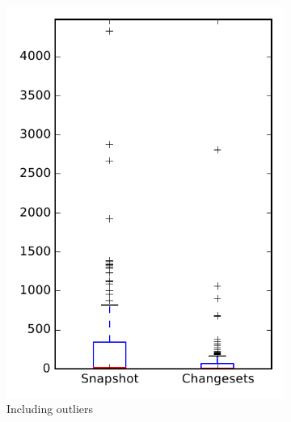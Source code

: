 
\begin{figure}
    \centering
    \begin{subfigure}{.4\textwidth}
        \centering
        \includegraphics[height=0.4\textheight]{figures/flt/rq1_openjpa}
        \caption{Including outliers}\label{fig:flt:rq1:openjpa_outlier}
    \end{subfigure}%
    \begin{subfigure}{.4\textwidth}
        \centering

\end{subfigure}
\end{figure}
